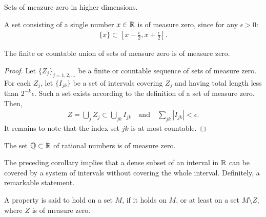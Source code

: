 \begin{todo}
  \begin{definition}
    \label{def:zero-set-2}
    Sets of meazure zero in higher dimensions.
  \end{definition}
\end{todo}

\begin{example}
  A set consisting of a single number $x\in\mathbb R$ is of measure zero,
  since for any $\epsilon>0$:
  \begin{gather*}
    \{x\} \subset \left[x-\tfrac\epsilon2,x+\tfrac\epsilon2\right].  
  \end{gather*}
\end{example}

\begin{lemma}
  The finite or countable union of sets of measure zero is of measure
  zero.
\end{lemma}

\begin{proof}
  Let $\{Z_j\}_{j=1,2,\dots}$ be a finite or countable sequence of
  sets of measure zero. For each $Z_j$, let $\{I_{jk}\}$ be a set of
  intervals covering $Z_j$ and having total length less than
  $2^{-k}\epsilon$. Such a set exists according to the definition of
  a set of measure zero. Then,
  \begin{gather*}
    Z = \bigcup_j Z_j \subset \bigcup_{jk} I_{jk}
    \quad\text{and}\quad
    \sum_{jk} |I_{jk}| < \epsilon.
  \end{gather*}
  It remains to note that the index set $jk$ is at most countable.
\end{proof}

\begin{corollary}
  The set $\mathbb Q\subset \mathbb R$ of rational numbers is of measure zero.
\end{corollary}

\begin{note}
  The preceding corollary implies that a dense subset of an interval
  in $\mathbb R$ can be covered by a system of intervals without covering the
  whole interval. Definitely, a remarkable statement.
\end{note}

\begin{definition}
  \label{def:almost-everywhere}
  A property is said to hold  on a set $M$,
  if it holds on $M$, or at least on a set $M\setminus Z$, where $Z$
  is of measure zero.
\end{definition}

